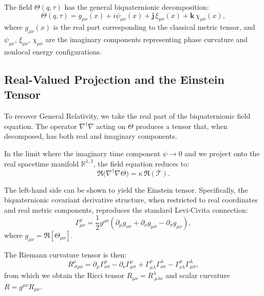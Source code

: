 The field $\Theta(q,\tau)$ has the general biquaternionic decomposition:
\begin{equation}
\Theta(q, \tau) = g_{\mu\nu}(x) + i\psi_{\mu\nu}(x) + \mathbf{j}\,\xi_{\mu\nu}(x) + \mathbf{k}\,\chi_{\mu\nu}(x),
\label{eq:theta_decomposition}
\end{equation}
where $g_{\mu\nu}(x)$ is the real part corresponding to the classical metric tensor, and $\psi_{\mu\nu}$, $\xi_{\mu\nu}$, $\chi_{\mu\nu}$ are the imaginary components representing phase curvature and nonlocal energy configurations.

\subsection{Real-Valued Projection and the Einstein Tensor}

To recover General Relativity, we take the real part of the biquaternionic field equation. The operator $\nabla^\dagger \nabla$ acting on $\Theta$ produces a tensor that, when decomposed, has both real and imaginary components.

In the limit where the imaginary time component $\psi \to 0$ and we project onto the real spacetime manifold $\mathbb{R}^{1,3}$, the field equation reduces to:
\begin{equation}
\Re\big(\nabla^\dagger \nabla \Theta\big) = \kappa \, \Re(\mathcal{T}).
\label{eq:real_projection}
\end{equation}

The left-hand side can be shown to yield the Einstein tensor. Specifically, the biquaternionic covariant derivative structure, when restricted to real coordinates and real metric components, reproduces the standard Levi-Civita connection:
\begin{equation}
\Gamma^\rho_{\mu\nu} = \frac{1}{2} g^{\rho\sigma} \left( \partial_\mu g_{\nu\sigma} + \partial_\nu g_{\mu\sigma} - \partial_\sigma g_{\mu\nu} \right),
\end{equation}
where $g_{\mu\nu} = \Re[\Theta_{\mu\nu}]$.

The Riemann curvature tensor is then:
\begin{equation}
R^\rho_{\ \sigma\mu\nu} = \partial_\mu \Gamma^\rho_{\nu\sigma} - \partial_\nu \Gamma^\rho_{\mu\sigma} + \Gamma^\rho_{\mu\lambda} \Gamma^\lambda_{\nu\sigma} - \Gamma^\rho_{\nu\lambda} \Gamma^\lambda_{\mu\sigma},
\end{equation}
from which we obtain the Ricci tensor $R_{\mu\nu} = R^\lambda_{\ \mu\lambda\nu}$ and scalar curvature $R = g^{\mu\nu} R_{\mu\nu}$.

